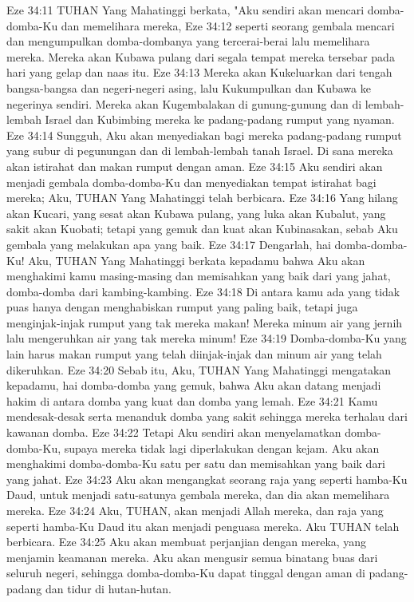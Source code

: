 Eze 34:11  TUHAN Yang Mahatinggi berkata, "Aku sendiri akan mencari domba-domba-Ku dan memelihara mereka,
Eze 34:12  seperti seorang gembala mencari dan mengumpulkan domba-dombanya yang tercerai-berai lalu memelihara mereka. Mereka akan Kubawa pulang dari segala tempat mereka tersebar pada hari yang gelap dan naas itu.
Eze 34:13  Mereka akan Kukeluarkan dari tengah bangsa-bangsa dan negeri-negeri asing, lalu Kukumpulkan dan Kubawa ke negerinya sendiri. Mereka akan Kugembalakan di gunung-gunung dan di lembah-lembah Israel dan Kubimbing mereka ke padang-padang rumput yang nyaman.
Eze 34:14  Sungguh, Aku akan menyediakan bagi mereka padang-padang rumput yang subur di pegunungan dan di lembah-lembah tanah Israel. Di sana mereka akan istirahat dan makan rumput dengan aman.
Eze 34:15  Aku sendiri akan menjadi gembala domba-domba-Ku dan menyediakan tempat istirahat bagi mereka; Aku, TUHAN Yang Mahatinggi telah berbicara.
Eze 34:16  Yang hilang akan Kucari, yang sesat akan Kubawa pulang, yang luka akan Kubalut, yang sakit akan Kuobati; tetapi yang gemuk dan kuat akan Kubinasakan, sebab Aku gembala yang melakukan apa yang baik.
Eze 34:17  Dengarlah, hai domba-domba-Ku! Aku, TUHAN Yang Mahatinggi berkata kepadamu bahwa Aku akan menghakimi kamu masing-masing dan memisahkan yang baik dari yang jahat, domba-domba dari kambing-kambing.
Eze 34:18  Di antara kamu ada yang tidak puas hanya dengan menghabiskan rumput yang paling baik, tetapi juga menginjak-injak rumput yang tak mereka makan! Mereka minum air yang jernih lalu mengeruhkan air yang tak mereka minum!
Eze 34:19  Domba-domba-Ku yang lain harus makan rumput yang telah diinjak-injak dan minum air yang telah dikeruhkan.
Eze 34:20  Sebab itu, Aku, TUHAN Yang Mahatinggi mengatakan kepadamu, hai domba-domba yang gemuk, bahwa Aku akan datang menjadi hakim di antara domba yang kuat dan domba yang lemah.
Eze 34:21  Kamu mendesak-desak serta menanduk domba yang sakit sehingga mereka terhalau dari kawanan domba.
Eze 34:22  Tetapi Aku sendiri akan menyelamatkan domba-domba-Ku, supaya mereka tidak lagi diperlakukan dengan kejam. Aku akan menghakimi domba-domba-Ku satu per satu dan memisahkan yang baik dari yang jahat.
Eze 34:23  Aku akan mengangkat seorang raja yang seperti hamba-Ku Daud, untuk menjadi satu-satunya gembala mereka, dan dia akan memelihara mereka.
Eze 34:24  Aku, TUHAN, akan menjadi Allah mereka, dan raja yang seperti hamba-Ku Daud itu akan menjadi penguasa mereka. Aku TUHAN telah berbicara.
Eze 34:25  Aku akan membuat perjanjian dengan mereka, yang menjamin keamanan mereka. Aku akan mengusir semua binatang buas dari seluruh negeri, sehingga domba-domba-Ku dapat tinggal dengan aman di padang-padang dan tidur di hutan-hutan.
